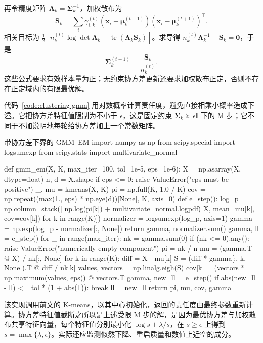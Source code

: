 再令精度矩阵 $\bm{\Lambda}_k=\bm{\Sigma}_k^{-1}$，加权散布为
\[
 \bm{S}_k=\sum_i\gamma_{i,k}^{(t)}
 (\bm{x}_i-\bm{\mu}_k^{(t+1)})
 (\bm{x}_i-\bm{\mu}_k^{(t+1)})^\top.
\]
相关目标为 $\tfrac12[n_k^{(t)}\log\det\bm{\Lambda}_k-\operatorname{tr}(\bm{\Lambda}_k\bm{S}_k)]$。求导得 $n_k^{(t)}\bm{\Lambda}_k^{-1}-\bm{S}_k=\bm{0}$，于是
\begin{equation}
 \bm{\Sigma}_k^{(t+1)}
 =\frac{\bm{S}_k}{n_k^{(t)}}.
 \label{eq:clustering-gmm-covariance}
\end{equation}
这些公式要求有效样本量为正；无约束协方差更新还要求加权散布正定，否则不存在正定域内的有限最优解。

代码~\ref{code:clustering-gmm} 用对数概率计算责任度，避免直接相乘小概率造成下溢。它把协方差特征值限制为不小于 $\epsilon$，这是固定约束 $\bm{\Sigma}_k\succeq\epsilon\bm{I}$ 下的 M 步；它不同于不加说明地每轮给协方差加上一个常数矩阵。

\begin{codeblock}[language=Python,label={code:clustering-gmm}]{带协方差下界的 GMM--EM}
import numpy as np
from scipy.special import logsumexp
from scipy.stats import multivariate_normal

def gmm_em(X, K, max_iter=100, tol=1e-5, eps=1e-6):
    X = np.asarray(X, dtype=float)
    n, d = X.shape
    if eps <= 0:
        raise ValueError("eps must be positive")
    _, mu = kmeans(X, K)
    pi = np.full(K, 1.0 / K)
    cov = np.repeat((max(1., eps) * np.eye(d))[None], K, axis=0)
    def e_step():
        log_p = np.column_stack([
            np.log(pi[k]) + multivariate_normal.logpdf(
                X, mean=mu[k], cov=cov[k])
            for k in range(K)])
        normalizer = logsumexp(log_p, axis=1)
        gamma = np.exp(log_p - normalizer[:, None])
        return gamma, normalizer.sum()
    gamma, ll = e_step()
    for _ in range(max_iter):
        nk = gamma.sum(0)
        if (nk <= 0).any():
            raise ValueError("numerically empty component")
        pi = nk / n
        mu = (gamma.T @ X) / nk[:, None]
        for k in range(K):
            diff = X - mu[k]
            S = (diff * gamma[:, k, None]).T @ diff / nk[k]
            values, vectors = np.linalg.eigh(S)
            cov[k] = (vectors * np.maximum(values, eps)) @ vectors.T
        gamma, new_ll = e_step()
        if abs(new_ll - ll) <= tol * (1 + abs(ll)):
            break
        ll = new_ll
    return pi, mu, cov, gamma
\end{codeblock}

该实现调用前文的 K-means，以其中心初始化，返回的责任度由最终参数重新计算。协方差特征值截断之所以是上述受限 M 步的解，是因为最优协方差与加权散布共享特征向量，每个特征值分别最小化 $\log s+\lambda/s$，在 $s\geq\epsilon$ 上得到 $s=\max\{\lambda,\epsilon\}$。实际还应监测似然下降、重启质量和数值上近空的成分。

